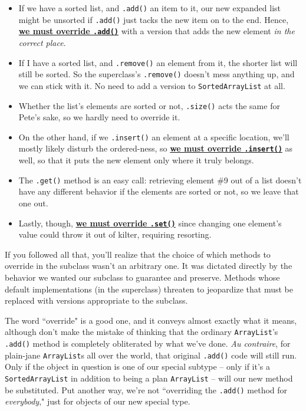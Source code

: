 \begin{itemize}
\itemsep.1em

\item If we have a sorted list, and \texttt{.add()} an item to it, our new
expanded list might be unsorted if \texttt{.add()} just tacks the new item on
to the end. Hence, \underline{\textbf{we must override \texttt{.add()}}} with
a version that adds the new element \textit{in the correct place}.

\item If I have a sorted list, and \texttt{.remove()} an element from it, the
shorter list will still be sorted. So the superclass's \texttt{.remove()}
doesn't mess anything up, and we can stick with it. No need to add a version
to \texttt{SortedArrayList} at all.

\item Whether the list's elements are sorted or not, \texttt{.size()} acts the
same for Pete's sake, so we hardly need to override it.

\item On the other hand, if we \texttt{.insert()} an element at a specific
location, we'll mostly likely disturb the ordered-ness, so
\underline{\textbf{we must override \texttt{.insert()}}} as well, so that it
puts the new element only where it truly belongs.

\item The \texttt{.get()} method is an easy call: retrieving element \#9 out
of a list doesn't have any different behavior if the elements are sorted or
not, so we leave that one out.

\item Lastly, though, \underline{\textbf{we must override \texttt{.set()}}}
since changing one element's value could throw it out of kilter, requiring
resorting.

\end{itemize}

If you followed all that, you'll realize that the choice of which methods to
override in the subclass wasn't an arbitrary one. It was dictated directly by
the behavior we wanted our subclass to guarantee and preserve. Methods whose
default implementations (in the superclass) threaten to jeopardize that must
be replaced with versions appropriate to the subclass.

The word ``override" is a good one, and it conveys almost exactly what it
means, although don't make the mistake of thinking that the ordinary
\texttt{ArrayList}'s \texttt{.add()} method is completely obliterated by what
we've done. \textit{Au contraire}, for plain-jane \texttt{ArrayList}s all over
the world, that original \texttt{.add()} code will still run. Only if the
object in question is one of our special subtype -- only if it's a
\texttt{SortedArrayList} in addition to being a plan \texttt{ArrayList} --
will our new method be substituted. Put another way, we're not ``overriding
the \texttt{.add()} method for \textit{everybody}," just for objects of our
new special type.

